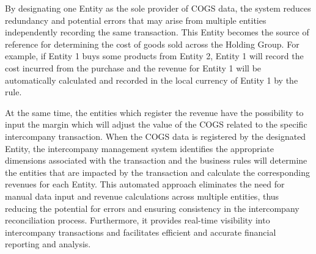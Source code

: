 \documentclass[12pt,a4paper,openright,twoside]{book}
\begin{document}



By designating one Entity as the sole provider of COGS data, the system reduces redundancy and potential errors that may arise from multiple entities independently recording the same transaction. 
%
This Entity becomes the source of reference for determining the cost of goods sold across the Holding Group.
%
For example, if Entity 1 buys some products from Entity 2, Entity 1 will record the cost incurred from the purchase and the revenue for Entity 1 will be automatically calculated and recorded in the local currency of Entity 1 by the rule.

At the same time, the entities which register the revenue have the possibility to input the margin which will adjust the value of the COGS related to the specific intercompany transaction.
%
When the COGS data is registered by the designated Entity, the intercompany management system identifies the appropriate dimensions associated with the transaction and the business rules will determine the entities that are impacted by the transaction and calculate the corresponding revenues for each Entity.
%
This automated approach eliminates the need for manual data input and revenue calculations across multiple entities, thus reducing the potential for errors and ensuring consistency in the intercompany reconciliation process. 
%
Furthermore, it provides real-time visibility into intercompany transactions and facilitates efficient and accurate financial reporting and analysis.

\chapter{\conclusionsname}
\label{chap:conclusions}

\end{document}
